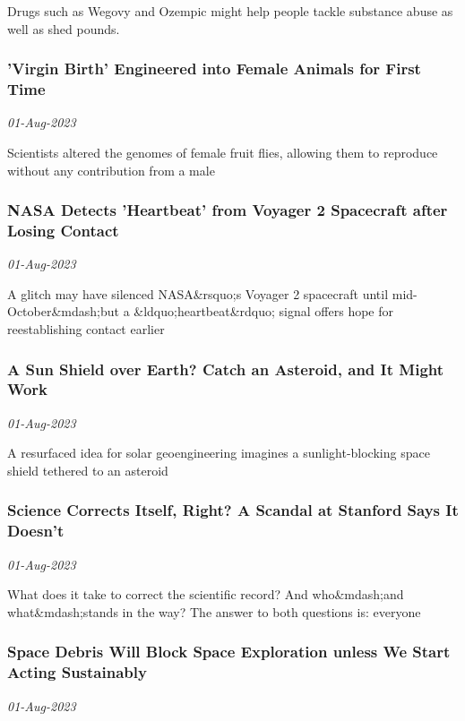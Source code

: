 Drugs such as Wegovy and Ozempic might help people tackle substance abuse as well as shed pounds.
\subsubsection{'Virgin Birth' Engineered into Female Animals for First Time \href{https://www.scientificamerican.com/article/virgin-birth-engineered-into-female-animals-for-first-time/}{}}
\textit{01-Aug-2023}

Scientists altered the genomes of female fruit flies, allowing them to reproduce without any contribution from a male
\subsubsection{NASA Detects 'Heartbeat' from Voyager 2 Spacecraft after Losing Contact \href{https://www.scientificamerican.com/article/nasa-detects-heartbeat-from-voyager-2-spacecraft-after-losing-contact/}{}}
\textit{01-Aug-2023}

A glitch may have silenced NASA\&rsquo;s Voyager 2 spacecraft until mid-October\&mdash;but a \&ldquo;heartbeat\&rdquo; signal offers hope for reestablishing contact earlier
\subsubsection{A Sun Shield over Earth? Catch an Asteroid, and It Might Work \href{https://www.scientificamerican.com/article/a-sun-shield-over-earth-catch-an-asteroid-and-it-might-work/}{}}
\textit{01-Aug-2023}

A resurfaced idea for solar geoengineering imagines a sunlight-blocking space shield tethered to an asteroid
\subsubsection{Science Corrects Itself, Right? A Scandal at Stanford Says It Doesn't \href{https://www.scientificamerican.com/article/science-corrects-itself-right-a-scandal-at-stanford-says-it-doesnt/}{}}
\textit{01-Aug-2023}

What does it take to correct the scientific record? And who\&mdash;and what\&mdash;stands in the way? The answer to both questions is: everyone
\subsubsection{Space Debris Will Block Space Exploration unless We Start Acting Sustainably \href{https://www.scientificamerican.com/article/space-debris-will-block-space-exploration-unless-we-start-acting-sustainably/}{}}
\textit{01-Aug-2023}

